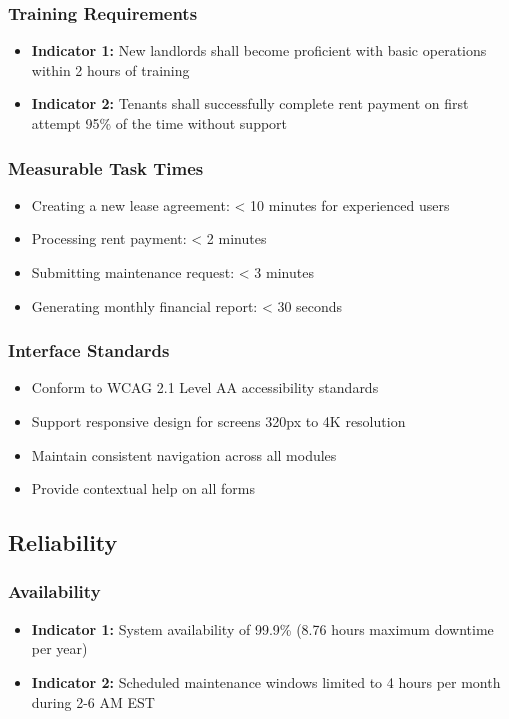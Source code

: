 \documentclass[12pt]{article}
\begin{document}
\subsubsection{Training Requirements}
\begin{itemize}
    \item \textbf{Indicator 1:} New landlords shall become proficient with basic operations within 2 hours of training
    \item \textbf{Indicator 2:} Tenants shall successfully complete rent payment on first attempt 95\% of the time without support
\end{itemize}

\subsubsection{Measurable Task Times}
\begin{itemize}
    \item Creating a new lease agreement: < 10 minutes for experienced users
    \item Processing rent payment: < 2 minutes
    \item Submitting maintenance request: < 3 minutes
    \item Generating monthly financial report: < 30 seconds
\end{itemize}

\subsubsection{Interface Standards}
\begin{itemize}
    \item Conform to WCAG 2.1 Level AA accessibility standards
    \item Support responsive design for screens 320px to 4K resolution
    \item Maintain consistent navigation across all modules
    \item Provide contextual help on all forms
\end{itemize}

\subsection{Reliability}

\subsubsection{Availability}
\begin{itemize}
    \item \textbf{Indicator 1:} System availability of 99.9\% (8.76 hours maximum downtime per year)
    \item \textbf{Indicator 2:} Scheduled maintenance windows limited to 4 hours per month during 2-6 AM EST
\end{itemize}
\end{document}
